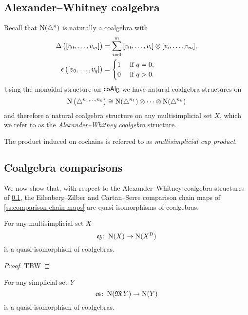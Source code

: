 \subsection{Alexander--Whitney coalgebra} \label{ss:alexander-whitney coalgebras}

Recall that $\operatorname{N}(\triangle^n)$ is naturally a coalgebra with
\[
\begin{split}
\operatorname{\Delta} \big( [v_0, \dots, v_m] \big) &=
\sum_{i=0}^m \, [v_0, \dots, v_i] \otimes [v_i, \dots, v_m], \\
\operatorname{\epsilon} \big( [v_0, \dots, v_q] \big) &=
\begin{cases} 1 & \text{ if } q = 0, \\ 0 & \text{ if } q>0. \end{cases}
\end{split}
\]
Using the monoidal structure on $\mathsf{coAlg}$ we have natural coalgebra structures on
\[
\operatorname{N} \big( \triangle^{n_1, \dots, n_k} \big) \cong
\operatorname{N}(\triangle^{n_1}) \otimes \dotsb \otimes \operatorname{N}(\triangle^{n_k})
\]
and therefore a natural coalgebra structure on any multisimplicial set $X$, which we refer to as the \textit{Alexander--Whitney coalgebra} structure.


The product induced on cochains is referred to as \textit{multisimplicial cup product}.

\subsection{Coalgebra comparisons}

We now show that, with respect to the Alexander--Whitney coalgebra structures of \cref{ss:alexander-whitney coalgebras}, the Eilenberg--Zilber and Cartan--Serre comparison chain maps of \cref{ss:comparison chain maps} are quasi-isomorphisms of coalgebras.

\begin{theorem}
	For any multisimplicial set $X$
	\[
	\operatorname{\mathfrak{ez}} \colon \operatorname{N}(X) \to \operatorname{N}(X^{\mathrm{D}})
	\]
	is a quasi-isomorphism of coalgebras.
\end{theorem}

\begin{proof}
	TBW 
\end{proof}

\begin{theorem}
	For any simplicial set $Y$
	\[
	\operatorname{\mathfrak{cs}} \colon \operatorname{N}(\operatorname{\mathfrak{M}} Y) \to \operatorname{N}(Y)
	\]
	is a quasi-isomorphism of coalgebras.
\end{theorem}

